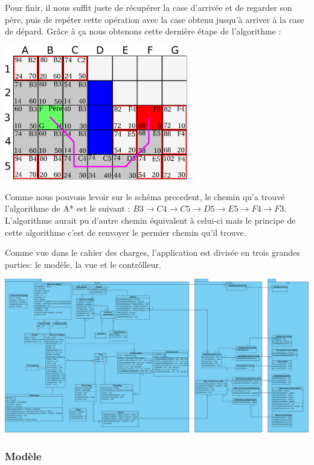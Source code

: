 			Pour finir, il nous suffit juste de récupérer la case d'arrivée et de regarder son père, puis de repéter cette opération avec la case obtenu jusqu'à arriver à la case de dépard. Grâce à ça nous obtenons cette dernière étape de l'algorithme :
			\begin{center}
				\includegraphics[width=8cm]{./Analyse/Img/Grille6.eps}
			\end{center}
		
			Comme nous pouvons levoir sur le schéma precedent, le chemin qu'a trouvé l'algorithme de A* est le suivant : $ B3 \rightarrow C4 \rightarrow C5 \rightarrow D5 \rightarrow E5 \rightarrow F4 \rightarrow F3 $. L'algorithme aurait pu d'autre chemin équivalent à celui-ci mais le principe de cette algorithme c'est de renvoyer le permier chemin qu'il trouve.
	
	Comme vue dans le cahier des charges, l'application est divisée en 
	trois grandes parties: le modèle, la vue et le contrôlleur.
	
	\begin{center}
		\includegraphics[scale=0.43, angle=90]{./Analyse/Img/BomberblocDiagramme.eps}
	\end{center}
	
	\subsubsection{Modèle}
	
